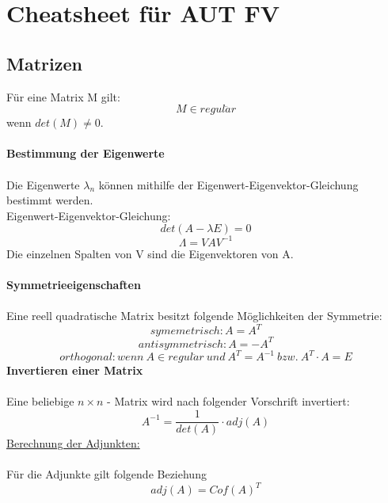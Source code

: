 \documentclass[12pt]{article}
\begin{document}
\section{Cheatsheet für AUT FV}
\subsection{Matrizen}
Für eine Matrix M gilt:
\[ M \in regul\ddot{a}r\] 
wenn $ det(M) \neq 0 $. \\ \\
\textbf{Bestimmung der Eigenwerte} \\ \\
Die Eigenwerte $ \lambda_{n} $ können mithilfe der Eigenwert-Eigenvektor-Gleichung bestimmt werden. \\
Eigenwert-Eigenvektor-Gleichung:
\[ det(A - \lambda E) = 0 \]
\[ \Lambda = VAV^{-1} \] 
Die einzelnen Spalten von V sind die Eigenvektoren von A. \\ \\
\textbf{Symmetrieeigenschaften}\\ \\
Eine reell quadratische Matrix besitzt folgende Möglichkeiten der Symmetrie:\\
\[ symemetrisch: A = A^{T}\]
\[ antisymmetrisch: A = -A^{T} \]
\[ orthogonal: wenn \ A \in regul\ddot{a}r \ und \ A^{T} = A^{-1} \ bzw.\  A^{T} \cdot A = E \]
\textbf{Invertieren einer Matrix} \\ \\
Eine beliebige $ n \times n $ - Matrix wird nach folgender Vorschrift invertiert: \\
\[ A^{-1} = \frac{1}{det(A)} \cdot adj(A) \]
\underline{Berechnung der Adjunkten:} \\ \\
Für die Adjunkte gilt folgende Beziehung
\[ adj(A) = Cof(A)^{T} \] %
\end{document}
